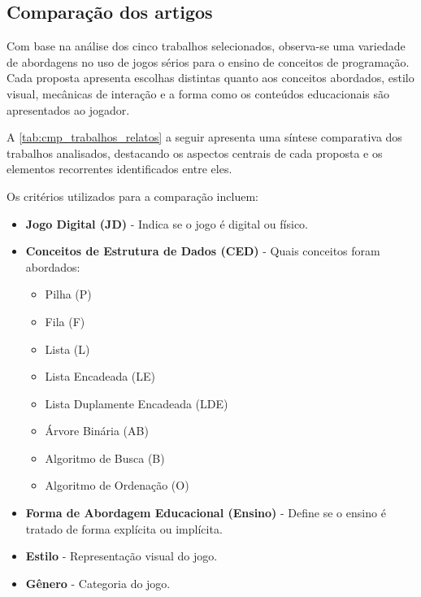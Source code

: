 \subsection{Comparação dos artigos}

Com base na análise dos cinco trabalhos selecionados, observa-se uma variedade
de abordagens no uso de jogos sérios para o ensino de conceitos de programação.
Cada proposta apresenta escolhas distintas quanto aos conceitos abordados,
estilo visual, mecânicas de interação e a forma como os conteúdos educacionais
são apresentados ao jogador.

A \autoref{tab:cmp_trabalhos_relatos} a seguir apresenta uma síntese
comparativa dos trabalhos analisados, destacando os aspectos centrais de cada
proposta e os elementos recorrentes identificados entre eles.

Os critérios utilizados para a comparação incluem:

\begin{itemize}
  \item \textbf{Jogo Digital (JD)} - Indica se o jogo é digital ou físico.
  \item \textbf{Conceitos de Estrutura de Dados (CED)} - Quais conceitos foram abordados:
    \begin{itemize}
      \item Pilha (P)
      \item Fila (F)
      \item Lista (L)
      \item Lista Encadeada (LE)
      \item Lista Duplamente Encadeada (LDE)
      \item Árvore Binária (AB)
      \item Algoritmo de Busca (B)
      \item Algoritmo de Ordenação (O)
    \end{itemize}
  \item \textbf{Forma de Abordagem Educacional (Ensino)} - Define se o ensino é tratado de forma explícita ou implícita.
  \item \textbf{Estilo} - Representação visual do jogo.
  \item \textbf{Gênero} - Categoria do jogo.
\end{itemize}


